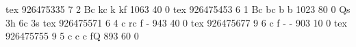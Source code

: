 tex       926475335  7  2 Bc  kc    k     kf        1063   40    0 
tex       926475453  6  1 Bc  bc    b     b         1023   80    0 Qs 3h 6c 3s
tex       926475571  6  4 c   rc    f     -          943   40    0 
tex       926475677  9  6 c   f     -     -          903   10    0 
tex       926475755  9  5 c   c     c     fQ         893   60    0 

